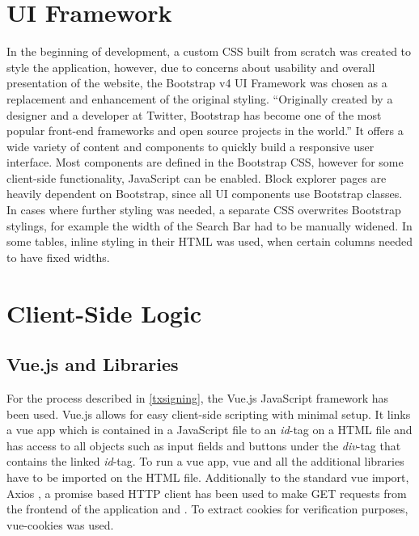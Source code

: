 \section{UI Framework} \label{sec:uiframeworks}
In the beginning of development, a custom CSS built from scratch was created to style the application, however, due to concerns about usability and overall presentation of the website, the Bootstrap v4 UI Framework \cite{bootstrap} was chosen as a replacement and enhancement of the original styling.
``Originally created by a designer and a developer at Twitter, Bootstrap has become one of the most popular front-end frameworks and open source projects in the world.'' \cite{bootstraphistory}
It offers a wide variety of content and components to quickly build a responsive user interface. Most components are defined in the Bootstrap CSS, however for some client-side functionality, JavaScript can be enabled. Block explorer pages are heavily dependent on Bootstrap, since all UI components use Bootstrap classes. In cases where further styling was needed, a separate CSS overwrites Bootstrap stylings, for example the width of the Search Bar had to be manually widened. In some tables, inline styling in their HTML was used, when certain columns needed to have fixed widths.

\section{Client-Side Logic} \label{sec:clientside}

\subsection{Vue.js and Libraries} \label{vuejs}
For the process described in \ref{txsigning}, the Vue.js JavaScript framework \cite{vue} has been used. Vue.js allows for easy client-side scripting with minimal setup. It links a vue app which is contained in a JavaScript file to an \emph{id}-tag on a HTML file and has access to all objects such as input fields and buttons under the \emph{div}-tag that contains the linked  \emph{id}-tag. To run a vue app, vue and all the additional libraries have to be imported on the HTML file. Additionally to the standard vue import, Axios , a promise based HTTP client \cite{axios} has been used to make GET requests from the frontend of the application and . To extract cookies for verification purposes, vue-cookies \cite{vcookies} was used. 

